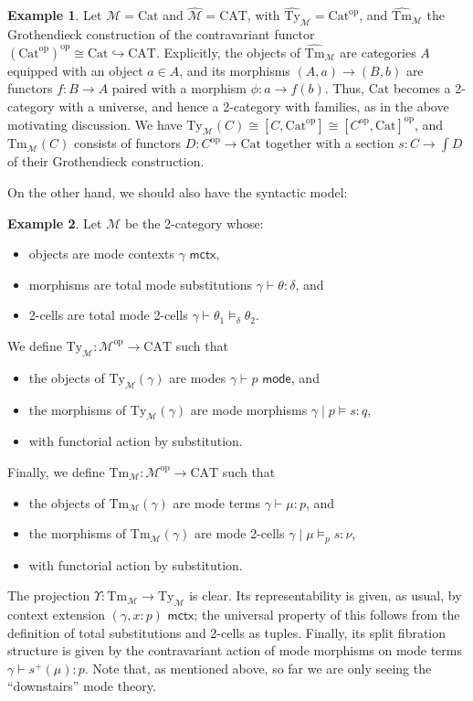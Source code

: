 \documentclass[10pt]{article}
\theoremstyle{definition}
\newtheorem{example}{Example}
\newcommand{\yields}{\vdash}
\newcommand{\ctx}{\,\,\mathsf{mctx}}
\newcommand{\type}{\,\,\mathsf{mode}}
\newcommand\TypeTwo[4]{\ensuremath{#1 \mid #3 \vDash #2 : #4}}
\newcommand\TermTwoT[5]{\ensuremath{#1 \mid #3 \vDash_{#5} {#2} : #4}}
\newcommand\TrPlus[2]{\ensuremath{{#1}^+(#2)}}
\newcommand\op{^{\mathrm{op}}}
\newcommand\Cat{\mathrm{Cat}}
\newcommand\CAT{\mathrm{CAT}}
\newcommand\M{\mathcal{M}}
\newcommand\Mhat{\widehat{\mathcal{M}}}
\newcommand\Mty{{\mathrm{Ty}_{\M}}}
\newcommand\Mtm{{\mathrm{Tm}_{\M}}}
\newcommand\Mtyhat{{\widehat{\mathrm{Ty}}_{\M}}}
\newcommand\Mtmhat{{\widehat{\mathrm{Tm}}_{\M}}}
\newcommand\Ups{\Upsilon}
\begin{document}
\begin{example}\label{eg:cat-2cwf}
  Let $\M=\Cat$ and $\Mhat=\CAT$, with $\Mtyhat = \Cat\op$, and $\Mtmhat$ the Grothendieck construction of the contravariant functor $(\Cat\op)\op \cong \Cat \hookrightarrow \CAT$.
  Explicitly, the objects of $\Mtmhat$ are categories $A$ equipped with an object $a\in A$, and its morphisms $(A,a) \to (B,b)$ are functors $f:B\to A$ paired with a morphism $\phi : a\to f(b)$.
  Thus, $\Cat$ becomes a 2-category with a universe, and hence a 2-category with families, as in the above motivating discussion.
  We have $\Mty(C) \cong [C,\Cat\op] \cong [C\op,\Cat]\op$, and $\Mtm(C)$ consists of functors $D:C\op\to\Cat$ together with a section $s:C\to \int D$ of their Grothendieck construction.
\end{example}

On the other hand, we should also have the syntactic model:

\begin{example}\label{eg:syn-2cwf}
  Let $\M$ be the 2-category whose:
  \begin{itemize}
  \item objects are mode contexts $\gamma \ctx$,
  \item morphisms are total mode substitutions $\gamma \yields \theta : \delta$, and
  \item 2-cells are total mode 2-cells $\gamma \yields \theta_1 \vDash_\delta \theta_2$.
  \end{itemize}
  We define $\Mty:\M\op\to\CAT$ such that
  \begin{itemize}
  \item the objects of $\Mty(\gamma)$ are modes $\gamma \yields p\type$, and
  \item the morphisms of $\Mty(\gamma)$ are mode morphisms $\TypeTwo{\gamma}{s}{p}{q}$,
  \item with functorial action by substitution.
  \end{itemize}
  Finally, we define $\Mtm:\M\op\to\CAT$ such that
  \begin{itemize}
  \item the objects of $\Mtm(\gamma)$ are mode terms $\gamma \yields \mu:p$, and
  \item the morphisms of $\Mtm(\gamma)$ are mode 2-cells $\TermTwoT{\gamma}{s}{\mu}{\nu}{p}$,
  \item with functorial action by substitution.
  \end{itemize}
  The projection $\Ups:\Mtm\to\Mty$ is clear.
  Its representability is given, as usual, by context extension $(\gamma, x:p) \ctx$; the universal property of this follows from the definition of total substitutions and 2-cells as tuples.
  Finally, its split fibration structure is given by the contravariant action of mode morphisms on mode terms ${\gamma \yields \TrPlus{s}{\mu} : p}$.
  Note that, as mentioned above, so far we are only seeing the ``downstairs'' mode theory.
\end{example}
\end{document}
